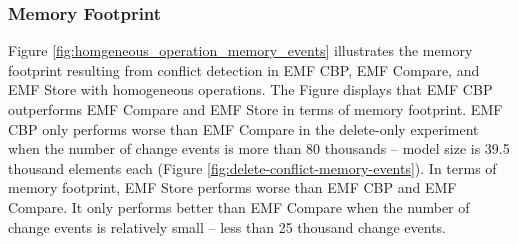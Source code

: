\subsubsection{Memory Footprint}
\label{sec:memory_footprint}
Figure \ref{fig:homgeneous_operation_memory_events} illustrates the memory footprint resulting from conflict detection in EMF CBP, EMF Compare, and EMF Store with homogeneous operations. The Figure displays that EMF CBP outperforms EMF Compare and EMF Store in terms of memory footprint. EMF CBP only performs worse than EMF Compare in the delete-only experiment when the number of change events is more than 80 thousands -- model size is 39.5 thousand elements each (Figure \ref{fig:delete-conflict-memory-events}). In terms of memory footprint, EMF Store performs worse than EMF CBP and EMF Compare. It only performs better than EMF Compare when the number of change events is relatively small -- less than 25 thousand change events. 

